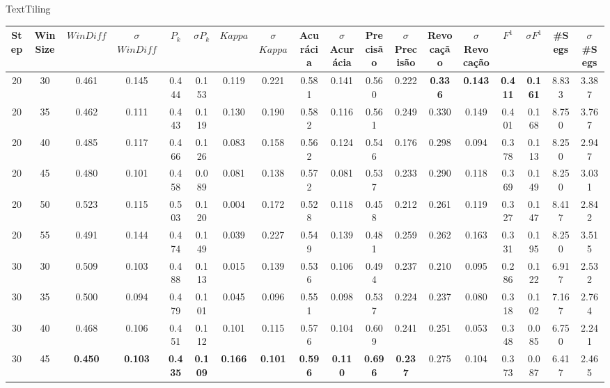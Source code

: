 \tiny
\center TextTiling
\begin{longtable}[c]{|c|c|c|c|c|c|c|c|c|c|c|c|c|c|c|c|c|c|} 
	\hline 
 Step & Win Size & $WinDiff$ & $\sigma$$WinDiff$ & $P_k$ & $\sigma$$P_k$ & $Kappa$ & $\sigma$$Kappa$ & Acurácia & $\sigma$Acurácia & Precisão & $\sigma$Precisão & Revocação & $\sigma$Revocação & $F^1$ & $\sigma$$F^1$ & \#Segs & $\sigma$\#Segs\\ \hline 
 20 & 30 & 0.461 & 0.145 & 0.444 & 0.153 & 0.119 & 0.221 & 0.581 & 0.141 & 0.560 & 0.222 & \cellcolor{gray!20} \textbf{0.336} & \cellcolor{gray!20} \textbf{0.143} & \cellcolor{gray!20} \textbf{0.411} & \cellcolor{gray!20} \textbf{0.161} & 8.833 & 3.387  \\ \hline 
  20 & 35 & 0.462 & 0.111 & 0.443 & 0.119 & 0.130 & 0.190 & 0.582 & 0.116 & 0.561 & 0.249 & 0.330 & 0.149 & 0.401 & 0.168 & 8.750 & 3.767  \\ \hline 
  20 & 40 & 0.485 & 0.117 & 0.466 & 0.126 & 0.083 & 0.158 & 0.562 & 0.124 & 0.546 & 0.176 & 0.298 & 0.094 & 0.378 & 0.113 & 8.250 & 2.947  \\ \hline 
  20 & 45 & 0.480 & 0.101 & 0.458 & 0.089 & 0.081 & 0.138 & 0.572 & 0.081 & 0.537 & 0.233 & 0.290 & 0.118 & 0.369 & 0.149 & 8.250 & 3.031  \\ \hline 
  20 & 50 & 0.523 & 0.115 & 0.503 & 0.120 & 0.004 & 0.172 & 0.528 & 0.118 & 0.458 & 0.212 & 0.261 & 0.119 & 0.327 & 0.147 & 8.417 & 2.842  \\ \hline 
  20 & 55 & 0.491 & 0.144 & 0.474 & 0.149 & 0.039 & 0.227 & 0.549 & 0.139 & 0.481 & 0.259 & 0.262 & 0.163 & 0.331 & 0.195 & 8.250 & 3.515  \\ \hline 
  30 & 30 & 0.509 & 0.103 & 0.488 & 0.113 & 0.015 & 0.139 & 0.536 & 0.106 & 0.494 & 0.237 & 0.210 & 0.095 & 0.286 & 0.122 & 6.917 & 2.532  \\ \hline 
  30 & 35 & 0.500 & 0.094 & 0.479 & 0.101 & 0.045 & 0.096 & 0.551 & 0.098 & 0.537 & 0.224 & 0.237 & 0.080 & 0.318 & 0.102 & 7.167 & 2.764  \\ \hline 
  30 & 40 & 0.468 & 0.106 & 0.451 & 0.112 & 0.101 & 0.115 & 0.576 & 0.104 & 0.609 & 0.241 & 0.251 & 0.053 & 0.348 & 0.085 & 6.750 & 2.241  \\ \hline 
  30 & 45 & \cellcolor{gray!20} \textbf{0.450} & \cellcolor{gray!20} \textbf{0.103} & \cellcolor{gray!20} \textbf{0.435} & \cellcolor{gray!20} \textbf{0.109} & \cellcolor{gray!20} \textbf{0.166} & \cellcolor{gray!20} \textbf{0.101} & \cellcolor{gray!20} \textbf{0.596} & \cellcolor{gray!20} \textbf{0.110} & \cellcolor{gray!20} \textbf{0.696} & \cellcolor{gray!20} \textbf{0.237} & 0.275 & 0.104 & 0.373 & 0.087 & 6.417 & 2.465  \\ \hline 

\end{longtable}
